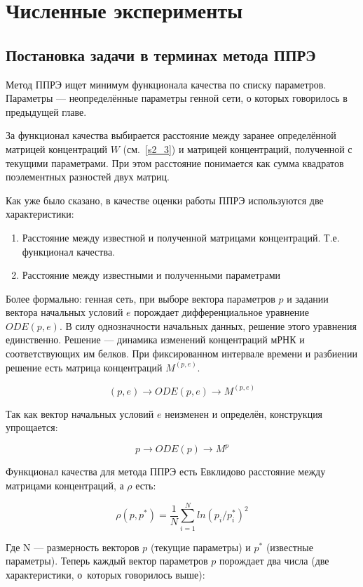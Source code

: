 \section{Численные эксперименты} \label{s3}

\subsection{Постановка задачи в терминах метода ППРЭ} \label{s3_1}

Метод ППРЭ ищет минимум функционала качества по списку параметров. Параметры — 
неопределённые параметры генной сети, о которых говорилось в предыдущей главе. 

За функционал качества выбирается расстояние между заранее определённой матрицей 
концентраций $W$ (см.~\ref{s2_3}) и матрицей концентраций, полученной с текущими 
параметрами. При этом расстояние понимается как сумма квадратов поэлементных 
разностей двух матриц. 

Как уже было сказано, в качестве оценки работы ППРЭ используются две 
характеристики: 
\begin{enumerate}
	\item Расстояние между известной и полученной матрицами концентраций. Т.е. 
	функционал качества.
	\item Расстояние между известными и полученными параметрами
\end{enumerate}

Более формально: генная сеть, при выборе вектора параметров $p$ и задании
вектора начальных условий $e$ порождает дифференциальное уравнение $ODE(p,e)$. В 
силу однозначности начальных данных, решение этого уравнения единственно. 
Решение — динамика изменений концентраций мРНК и соответствующих им белков. При
фиксированном интервале времени и разбиении решение есть матрица концентраций 
$M^{(p,e)}$.

\[ (p,e) \rightarrow ODE(p,e) \rightarrow M^{(p,e)} \]

Так как вектор начальных условий $e$ неизменен и определён, конструкция 
упрощается:

\[ p \rightarrow ODE(p) \rightarrow M^p \]

Функционал качества для метода ППРЭ есть Евклидово расстояние между матрицами 
концентраций, а $\rho$ есть:

\[ \rho(p,p^*) = \frac{1}{N} \sum\limits_{i = 1}^{N} ln(p_i/p^*_i)^2 \]

Где N — размерность векторов $p$ (текущие параметры) и $p^*$ (известные 
параметры). Теперь каждый вектор параметров $p$ порождает два числа (две 
характеристики, о~которых говорилось выше):

